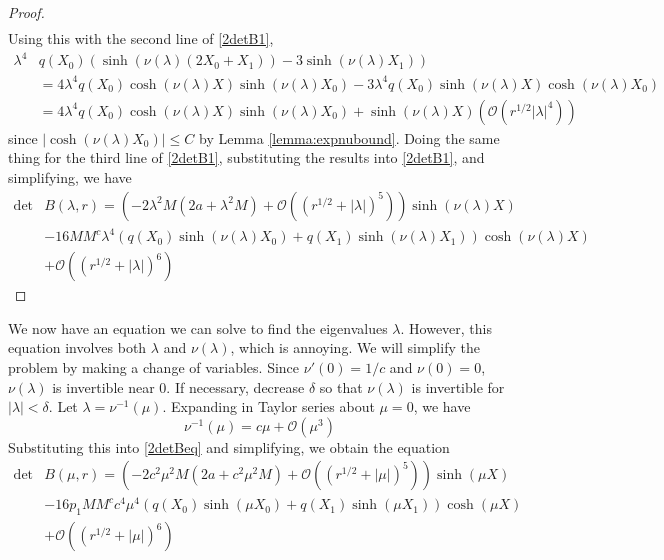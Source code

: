 \documentclass[thesis.tex]{subfiles}
\begin{document}
\begin{lemma}
\begin{proof}
\begin{align*}
\end{align*}
Using this with the second line of \cref{2detB1}, 
\begin{align*}
\lambda^4 &q(X_0) \left( \sinh(\nu(\lambda)(2 X_0 + X_1)) - 3 \sinh(\nu(\lambda)X_1)  \right) \\
&= 4 \lambda^4 q(X_0) \cosh(\nu(\lambda)X)\sinh(\nu(\lambda)X_0) - 3 \lambda^4 q(X_0) \sinh(\nu(\lambda)X)\cosh(\nu(\lambda)X_0) \\
&= 4 \lambda^4 q(X_0) \cosh(\nu(\lambda)X)\sinh(\nu(\lambda)X_0) + \sinh(\nu(\lambda)X)(\mathcal{O}(r^{1/2}|\lambda|^4))
\end{align*}
since $|\cosh(\nu(\lambda)X_0)|\leq C$ by Lemma \ref{lemma:expnubound}. Doing the same thing for the third line of \cref{2detB1}, substituting the results into \cref{2detB1}, and simplifying, we have
\begin{equation*}
\begin{aligned}
\det &B(\lambda, r) = \left(-2 \lambda^2 M (2a + \lambda^2 M) + \mathcal{O}( (r^{1/2} + |\lambda|)^5 )\right) \sinh(\nu(\lambda)X) \\
&-16 M M^c \lambda^4 ( q(X_0) \sinh(\nu(\lambda)X_0) + q(X_1) \sinh(\nu(\lambda)X_1) ) \cosh(\nu(\lambda)X)  \\
&+ \mathcal{O}( (r^{1/2} + |\lambda|)^6) 
\end{aligned}
\end{equation*}
\end{proof}
\end{lemma}

We now have an equation we can solve to find the eigenvalues $\lambda$. However, this equation involves both $\lambda$ and $\nu(\lambda)$, which is annoying. We will simplify the problem by making a change of variables. Since $\nu'(0) = 1/c$ and $\nu(0) = 0$, $\nu(\lambda)$ is invertible near 0. If necessary, decrease $\delta$ so that $\nu(\lambda)$ is invertible for $|\lambda| < \delta$. Let $\lambda = \nu^{-1}(\mu)$. Expanding in Taylor series about $\mu = 0$, we have
\[
\nu^{-1}(\mu) = c \mu + \mathcal{O}(\mu^3)
\]
Substituting this into \cref{2detBeq} and simplifying, we obtain the equation
\begin{equation}\label{2detBeqmu}
\begin{aligned}
\det &B(\mu, r) = \left(-2 c^2 \mu^2 M (2a + c^2 \mu^2 M) +  \mathcal{O}( (r^{1/2} + |\mu|)^5 )\right) \sinh(\mu X) \\
&-16 p_1 M M^c c^4 \mu^4 ( q(X_0) \sinh(\mu X_0) + q(X_1) \sinh(\mu X_1) ) \cosh(\mu X)  \\
&+ \mathcal{O}( (r^{1/2} + |\mu|)^6) 
\end{aligned}
\end{equation}
\end{document}
